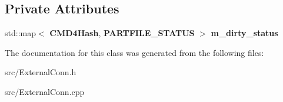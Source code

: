 \subsection*{Private Attributes}
\begin{DoxyCompactItemize}
\item 
std::map$<$ {\bf CMD4Hash}, {\bf PARTFILE\_\-STATUS} $>$ {\bfseries m\_\-dirty\_\-status}\label{classECPartFileMsgSource_a5194b53c05517ff993b4f377a6f426c6}

\end{DoxyCompactItemize}


The documentation for this class was generated from the following files:\begin{DoxyCompactItemize}
\item 
src/ExternalConn.h\item 
src/ExternalConn.cpp\end{DoxyCompactItemize}
